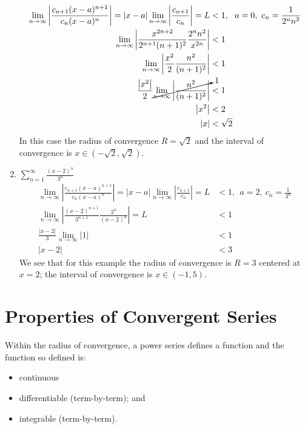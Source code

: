 \begin{enumerate}
\begin{align*}
\lim_{n \to\infty} \left|\frac{c_{n+1}(x-a)^{n+1}}{c_n(x-a)^n} \right| = |x-a| \lim_{n \to\infty} \left|\frac{c_{n+1}}{c_n} \right| = L &< 1, \ \ a=0, \ c_n=\frac{1}{2^n n^2} \\
\lim_{n \to\infty}\left|\frac{x^{2n+2}}{2^{n+1}(n+1)^2} \frac{2^n n^2}{x^{2n}} \right| &< 1 \\
\lim_{n \to\infty} \left|\frac{x^2}{2} \frac{n^2}{(n+1)^2} \right| &< 1 \\
\frac{\left|x^2 \right|}{2} \cancelto{1}{\lim_{n \to\infty}\left|\frac{n^2}{(n+1)^2} \right|} &< 1 \\
\left|x^2\right| &< 2 \\
|x| &< \sqrt{2}
\end{align*}
In this case the radius of convergence $R=\sqrt{2}$ and the interval of convergence is $x\in(-\sqrt{2},\sqrt{2})$.

\vspace{2.0cm}

\item $\sum\limits_{n=1}^{\infty} \frac{\left(x-2 \right)^n}{3^n}$ 
\begin{align*}
\lim_{n \to\infty} \left|\frac{c_{n+1}(x-a)^{n+1}}{c_n(x-a)^n} \right| = |x-a| \lim_{n \to\infty} \left|\frac{c_{n+1}}{c_n} \right| = L &< 1, \ \ a=2, \ c_n=\frac{1}{3^n} \\
\lim_{n \to\infty} \left|\frac{\left(x-2\right)^{n+1}}{3^{n+1}} \frac{3^n}{\left(x-2 \right)^n}\right| = L &< 1 \\
\frac{\left|x-2 \right|}{3} \lim_{n \to\infty}\left|1 \right| &< 1 \\
|x-2| &< 3
\end{align*}
We see that for this example the radius of convergence is $R=3$ centered at $x=2$; the interval of convergence is $x \in (-1,5)$.
\end{enumerate}

\section{Properties of Convergent Series}
Within the radius of convergence, a power series defines a function and the function so defined is:
\begin{itemize}
\item continuous 
\item differentiable (term-by-term); and
\item integrable (term-by-term).
\end{itemize}


